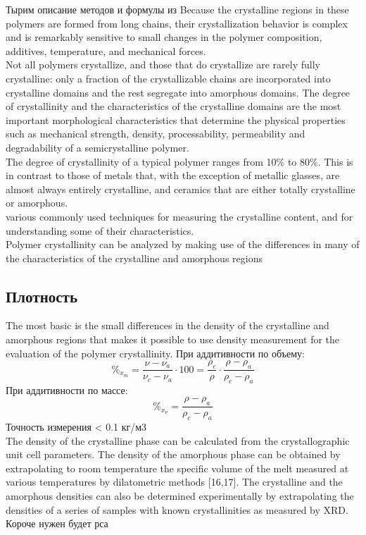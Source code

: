 Тырим описание методов и формулы из \cite{cryst3}
Because the crystalline regions in these
polymers are formed from long chains, their crystallization behavior is complex
and is remarkably sensitive to small changes in the polymer composition, additives,
temperature, and mechanical forces.\\
Not all polymers
crystallize, and those that do crystallize are rarely fully crystalline: only a fraction
of the crystallizable chains are incorporated into crystalline domains and the rest
segregate into amorphous domains. The degree of crystallinity and the characteristics
of the crystalline domains are the most important morphological characteristics
that determine the physical properties such as mechanical strength, density,
processability, permeability and degradability of a semicrystalline polymer.\\
The
degree of crystallinity of a typical polymer ranges from 10\% to 80\%. This is in
contrast to those of metals that, with the exception of metallic glasses, are almost
always entirely crystalline, and ceramics that are either totally crystalline or amorphous.\\
various
commonly used techniques for measuring the crystalline content, and for understanding
some of their characteristics.\\
Polymer crystallinity can be analyzed by making use of the differences in many of
the characteristics of the crystalline and amorphous regions\\
\subsection{Плотность}
The most basic is the
small differences in the density of the crystalline and amorphous regions that makes it
possible to use density measurement for the evaluation of the polymer crystallinity.
При аддитивности по объему:
\[
\%_{x_m} =\frac{\nu - \nu_a}{\nu_c - \nu_a}\cdot100 = \frac{\rho_c}{\rho}\cdot\frac{\rho - \rho_a}{\rho_c-\rho_a}
\]
При аддитивности по массе:
\[
\%_{x_{\nu}} =\frac{\rho - \rho_a}{\rho_c-\rho_a}
\]
Точность измерения < 0.1 кг/м3\\
The density of the crystalline phase
can be calculated from the crystallographic unit cell parameters. The density of
the amorphous phase can be obtained by extrapolating to room temperature the specific
volume of the melt measured at various temperatures by dilatometric methods
[16,17]. The crystalline and the amorphous densities can also be determined experimentally
by extrapolating the densities of a series of samples with known crystallinities
as measured by XRD.\\
Короче нужен будет рса

